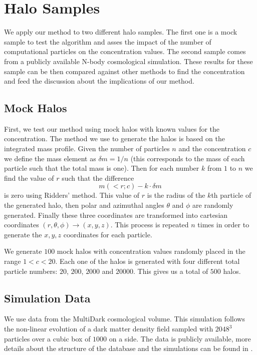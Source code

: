 \documentclass[useAMS,usenatbib]{mn2e}
\newcommand{\hMpc}{{\ifmmode{h^{-1}{\rm Mpc}}\else{$h^{-1}$Mpc }\fi}}
\begin{document}
\section{Halo Samples}

We apply our method to two different halo samples. The first one is a
mock sample to test the algorithm and asses the impact of the number
of computational particles on the concentration values. The second
sample comes from a publicly available N-body cosmological
simulation. These results for these sample can be then compared
against other methods to find the concentration and feed the
discussion about the implications of our method.

\subsection{Mock Halos}

First, we test our method using mock halos with known values for the
concentration. The method we use to generate the halos is based on the integrated
mass profile. Given the number of particles $n$ and the concentration
$c$ we define the mass element as $\delta m = 1/n$ (this corresponds
to the mass of each particle such that the total mass is one). Then
for each number $k$ from $1$ to $n$ we find the value of $r$ such that
the difference 
%
\begin{equation}
m(<r;c)-k \cdot \delta m 
\end{equation}
%
is zero using Ridders' method. This value of $r$ is the radius of
the $k$th particle of the generated halo, then polar and azimuthal
angles $\theta$ and $\phi$ are randomly generated. Finally these three
coordinates are transformed into cartesian coordinates
$(r,\theta,\phi) \rightarrow (x,y,z)$. This process is repeated $n$
times in order to generate the $x,y,z$ coordinates for each particle. 
 


We generate $100$ mock halos with concentration values randomly
placed in the range $1<c<20$. Each one of the halos is generated with
four different total particle numbers: $20$, $200$, $2000$ and
$20000$. This gives us a total of $500$ halos. 


\subsection{Simulation Data}
\label{sec:data}

We use data from the MultiDark cosmological volume. This simulation
follows the non-linear evolution of a dark matter density field
sampled with $2048^3$ particles over a cubic box of $1000$ \hMpc on a
side. The data is publicly available, more details about the structure
of the database and the simulations can be found in
\citep{2013AN....334..691R}. 
\end{document}

